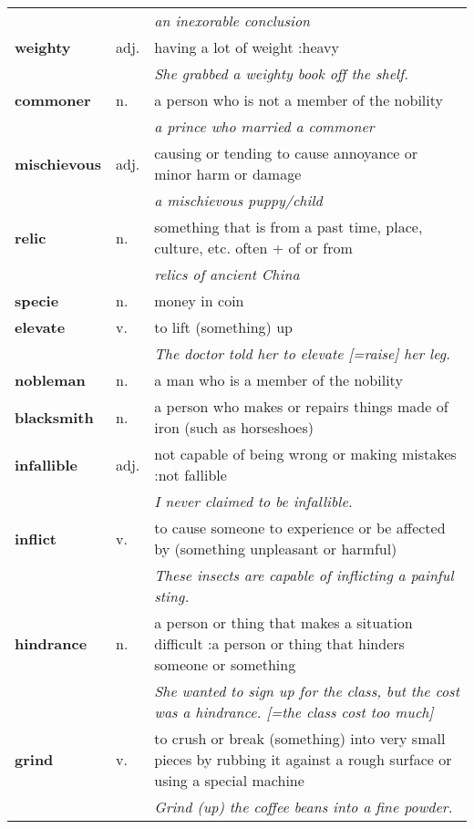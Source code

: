 \documentclass[a4paper]{article}
\begin{document}
\begin{longtable}{llp{11cm}}
 & & \textit{an inexorable conclusion}\\[0.08cm]
\textbf{weighty} & adj. &  having a lot of weight :heavy \\
 & & \textit{She grabbed a weighty book off the shelf.}\\[0.08cm]
\textbf{commoner} & n. &  a person who is not a member of the nobility \\
 & & \textit{a prince who married a commoner}\\[0.08cm]
\textbf{mischievous} & adj. &  causing or tending to cause annoyance or minor harm or damage \\
 & & \textit{a mischievous puppy/child}\\[0.08cm]
\textbf{relic} & n. &  something that is from a past time, place, culture, etc. often + of or from \\
 & & \textit{relics of ancient China}\\[0.08cm]
\textbf{specie} & n. &  money in coin\\[0.08cm]
\textbf{elevate} & v. &  to lift (something) up \\
 & & \textit{The doctor told her to elevate [=raise] her leg.}\\[0.08cm]
\textbf{nobleman} & n. &  a man who is a member of the nobility\\[0.08cm]
\textbf{blacksmith} & n. &  a person who makes or repairs things made of iron (such as horseshoes)\\[0.08cm]
\textbf{infallible} & adj. &  not capable of being wrong or making mistakes :not fallible \\
 & & \textit{I never claimed to be infallible.}\\[0.08cm]
\textbf{inflict} & v. &  to cause someone to experience or be affected by (something unpleasant or harmful) \\
 & & \textit{These insects are capable of inflicting a painful sting.}\\[0.08cm]
\textbf{hindrance} & n. &  a person or thing that makes a situation difficult :a person or thing that hinders someone or something \\
 & & \textit{She wanted to sign up for the class, but the cost was a hindrance. [=the class cost too much]}\\[0.08cm]
\textbf{grind} & v. &  to crush or break (something) into very small pieces by rubbing it against a rough surface or using a special machine \\
 & & \textit{Grind (up) the coffee beans into a fine powder.}\\[0.08cm]

\end{longtable}
\end{document}
